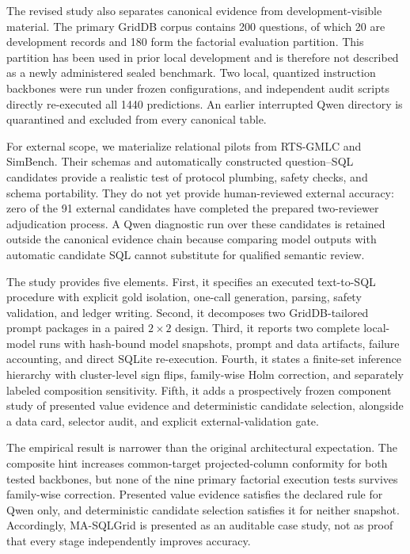 \documentclass[applsci,article,submit,moreauthors]{Definitions/mdpi}
\newcommand{\masql}{MA-SQLGrid}
\begin{document}
The revised study also separates canonical evidence from development-visible material. The primary GridDB corpus contains 200 questions, of which 20 are development records and 180 form the factorial evaluation partition. This partition has been used in prior local development and is therefore not described as a newly administered sealed benchmark. Two local, quantized instruction backbones were run under frozen configurations, and independent audit scripts directly re-executed all 1440 predictions. An earlier interrupted Qwen directory is quarantined and excluded from every canonical table.

For external scope, we materialize relational pilots from RTS-GMLC and SimBench. Their schemas and automatically constructed question--SQL candidates provide a realistic test of protocol plumbing, safety checks, and schema portability. They do not yet provide human-reviewed external accuracy: zero of the 91 external candidates have completed the prepared two-reviewer adjudication process. A Qwen diagnostic run over these candidates is retained outside the canonical evidence chain because comparing model outputs with automatic candidate SQL cannot substitute for qualified semantic review.

The study provides five elements. First, it specifies an executed text-to-SQL procedure with explicit gold isolation, one-call generation, parsing, safety validation, and ledger writing. Second, it decomposes two GridDB-tailored prompt packages in a paired $2\times2$ design. Third, it reports two complete local-model runs with hash-bound model snapshots, prompt and data artifacts, failure accounting, and direct SQLite re-execution. Fourth, it states a finite-set inference hierarchy with cluster-level sign flips, family-wise Holm correction, and separately labeled composition sensitivity. Fifth, it adds a prospectively frozen component study of presented value evidence and deterministic candidate selection, alongside a data card, selector audit, and explicit external-validation gate.

The empirical result is narrower than the original architectural expectation. The composite hint increases common-target projected-column conformity for both tested backbones, but none of the nine primary factorial execution tests survives family-wise correction. Presented value evidence satisfies the declared rule for Qwen only, and deterministic candidate selection satisfies it for neither snapshot. Accordingly, \masql{} is presented as an auditable case study, not as proof that every stage independently improves accuracy.
\end{document}
